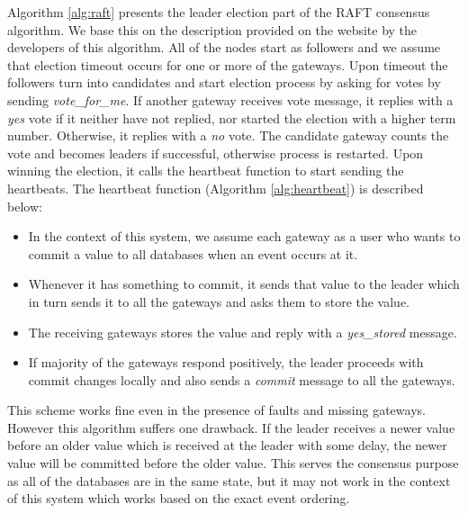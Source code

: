 \documentclass[12pt]{article}
\begin{document}
Algorithm \ref{alg:raft} presents the leader election part of the RAFT consensus algorithm. 
We base this on the description provided on the website by the developers of this 
algorithm. All of the nodes start as followers and we assume that election timeout occurs for
one or more of the gateways. Upon timeout the followers turn into candidates and 
start election process by asking for votes by sending \textit{vote\_for\_me}. 
If another gateway receives vote message, it replies with a \textit{yes} vote if it neither have not 
replied, nor started the election with a higher term number. Otherwise, it replies with a \textit{no} vote. 
The candidate gateway counts the vote and becomes leaders if successful, otherwise process is 
restarted.  Upon winning the election, it calls the heartbeat function to start sending the heartbeats. 
The heartbeat function (Algorithm \ref{alg:heartbeat}) is described below:

\begin{itemize}
	\item In the context of this system, we assume each gateway as a user who wants to commit a 
	value to all databases when an event occurs at it.
	\item Whenever it has something to commit, 
	it sends that value to the leader which in turn sends it to all the gateways and asks them 
	to store the value. 
	\item  The receiving gateways stores the value and reply with a \textit{yes\_stored}
	message.
	\item  If majority of the gateways respond positively, the leader proceeds with commit 
	changes locally and also sends a \textit{commit} message to all the gateways.
\end{itemize}

 This scheme 
works fine even in the presence of faults and missing gateways. However this algorithm suffers 
one drawback. If the leader receives a newer value before an older value which is received at the 
leader with some delay, the newer value will be committed before the older value. 
This serves the consensus purpose as all of the databases are in the same state, but 
it may not work in the context of this system which works based on the exact event ordering. 
\end{document}
